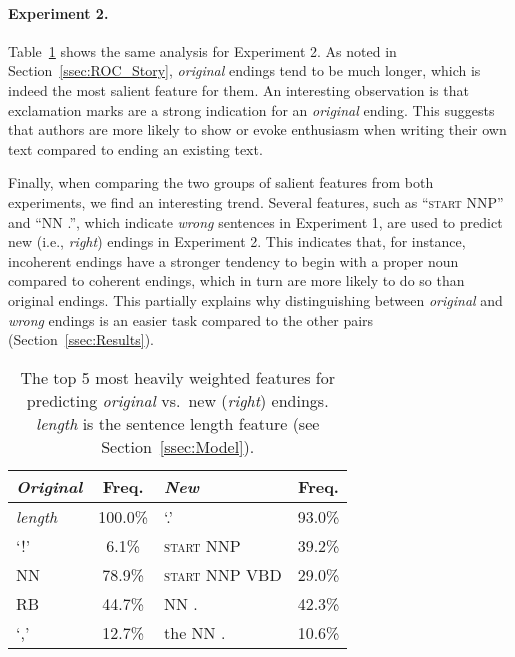 \documentclass[11pt,a4paper]{article}
\newcommand{\secref}[1]{Section~\ref{ssec:#1}}
\newcommand{\tabref}[1]{Table~\ref{#1}}
\begin{document}
\paragraph{Experiment 2.}
\tabref{exp2_features} shows the same analysis for Experiment 2.
As noted in \secref{ROC_Story}, {\it original} endings tend to be much longer, which is indeed the most salient feature for them.
An interesting observation is that exclamation marks are a strong
indication for an  {\it original} ending. 
This suggests that authors are more likely to show or evoke enthusiasm when writing their own text compared to ending an existing text.

Finally, when comparing the two groups of salient features from both experiments, we find an interesting trend.
Several features, such as ``\textsc{start} NNP'' and  ``NN .'', which indicate {\it wrong} sentences in Experiment 1, are used to predict new (i.e., {\it right}) endings in Experiment 2. 
This indicates that, for instance, incoherent endings have a stronger tendency to begin with a proper noun compared to coherent endings, 
which in turn are more likely to do so than original endings. 
This partially explains why distinguishing between {\it original} and {\it wrong} endings is an easier task compared to the other pairs (\secref{Results}).


\setlength\tabcolsep{.15cm}
\begin{table}[!t]
\begin{center}
\begin{tabular}{|p{1.25cm}|c||p{2.9cm}|c|} \hline
\textit{\textbf{Original}} & Freq. & \textit{\textbf{New}}& Freq. \\ \hline
{\it length} & {\color{white}{.}}100.0\% & `.' & 93.0\%\\ \hline
`!' & {\color{white}{00}}6.1\%& \textsc{start} NNP  & 39.2\% \\ \hline
NN & {\color{white}{00}}78.9\% & \textsc{start} NNP VBD &29.0\% \\ \hline
RB & {\color{white}{0}}44.7\%& NN . & 42.3\% \\ \hline
`,' & {\color{white}{0}}12.7\%&  the NN . & 10.6\% \\ \hline

\end{tabular}
\end{center}
\caption{\label{exp2_features}
The top 5 most heavily weighted features for predicting {\it original} vs.~new ({\it right}) endings.
{\it length} is the sentence length feature (see \secref{Model}).
}
\end{table}
\end{document}
